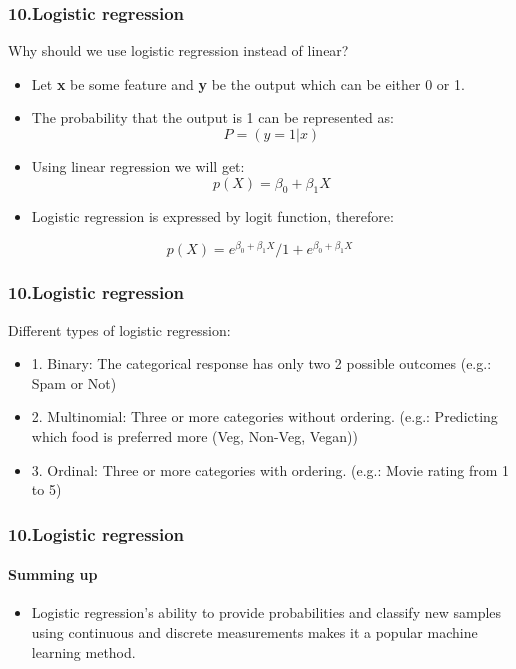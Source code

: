 \documentclass[handout,compress]{beamer} %
\begin{document}
\begin{frame}[allowframebreaks]
\frametitle{10.Logistic regression}
Why should we use logistic regression instead of linear?
\begin{itemize}
\item
Let \textbf{x} be some feature and \textbf{y} be the output which can be either 0 or 1. 
\item
The probability that the output is 1 can be represented as:
\begin{equation}
P = (y=1 | x)
\end{equation}
\item
Using linear regression we will get:  
\begin{equation}
p(X) = \beta_{0} + \beta_{1}X
\end{equation}
\item
Logistic regression is expressed by logit function, therefore:
\end{itemize}
\begin{equation}
p(X) = {e^{\beta_{0} + \beta_{1}X}}/{1 + e^{\beta_{0} + \beta_{1}X}}
\end{equation}
\end{frame}

\begin{frame}[allowframebreaks]
\frametitle{10.Logistic regression}
Different types of logistic regression:
\begin{itemize}
	\item
	1. Binary: The categorical response has only two 2 possible outcomes (e.g.: Spam or Not)
	\item
	2. Multinomial: Three or more categories without ordering. (e.g.: Predicting which food is preferred more (Veg, Non-Veg, Vegan))
	\item
	3. Ordinal: Three or more categories with ordering. (e.g.: Movie rating from 1 to 5)
\end{itemize}
\end{frame}
\begin{frame}[allowframebreaks]
\frametitle{10.Logistic regression}
\framesubtitle{Summing up}
\begin{itemize}
	\item
	Logistic regression's ability to provide probabilities and classify new samples using continuous and discrete measurements makes it a popular machine learning method.
\end{itemize}
\end{frame}
	 
\end{document}
